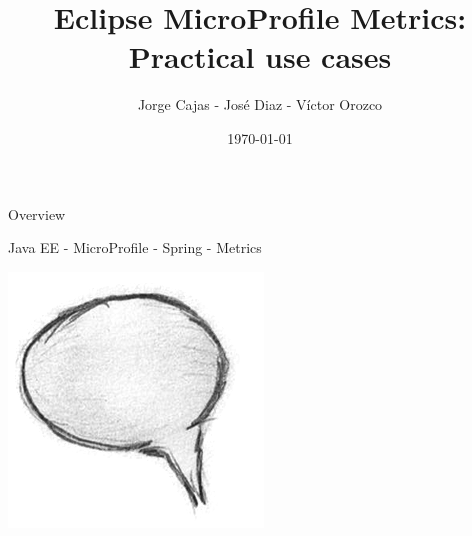 \documentclass{beamer}
\title{Eclipse MicroProfile Metrics: Practical use cases}
\author{Jorge Cajas - José Diaz - Víctor Orozco}
\institute{GuateJUG - PeruJUG}
\date{\today}
\begin{document}
\frame{\titlepage}

\begin{frame}{Overview}
\tableofcontents
\end{frame} 

\begin{frame}{Java EE - MicroProfile - Spring - Metrics}
\begin{center}
	\includegraphics[width=0.4\linewidth]{Images/comment}
\end{center}
\end{frame}
\end{document}
